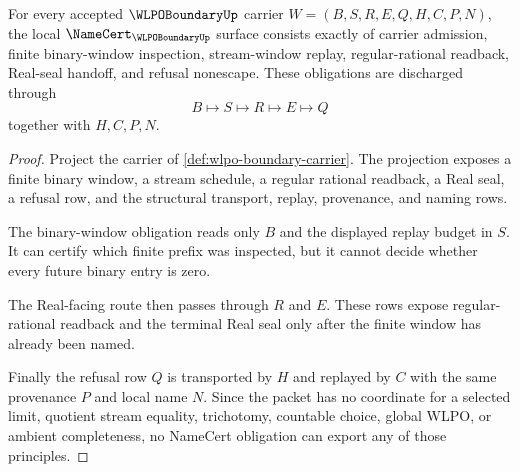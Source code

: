 \begin{theorem}
\label{thm:wlpo-boundary-namecert-obligations}
For every accepted $\WLPOBoundaryUp$ carrier $W=(B,S,R,E,Q,H,C,P,N)$, the local $\NameCert_{\WLPOBoundaryUp}$ surface consists exactly of carrier admission, finite binary-window inspection, stream-window replay, regular-rational readback, Real-seal handoff, and refusal nonescape. These obligations are discharged through
$$
B\longmapsto S\longmapsto R\longmapsto E\longmapsto Q
$$
together with $H,C,P,N$.
\end{theorem}
\begin{proof}
Project the carrier of \autoref{def:wlpo-boundary-carrier}. The projection exposes a finite binary window, a stream schedule, a regular rational readback, a Real seal, a refusal row, and the structural transport, replay, provenance, and naming rows.

The binary-window obligation reads only $B$ and the displayed replay budget in $S$. It can certify which finite prefix was inspected, but it cannot decide whether every future binary entry is zero.

The Real-facing route then passes through $R$ and $E$. These rows expose regular-rational readback and the terminal Real seal only after the finite window has already been named.

Finally the refusal row $Q$ is transported by $H$ and replayed by $C$ with the same provenance $P$ and local name $N$. Since the packet has no coordinate for a selected limit, quotient stream equality, trichotomy, countable choice, global WLPO, or ambient completeness, no NameCert obligation can export any of those principles.
\end{proof}


